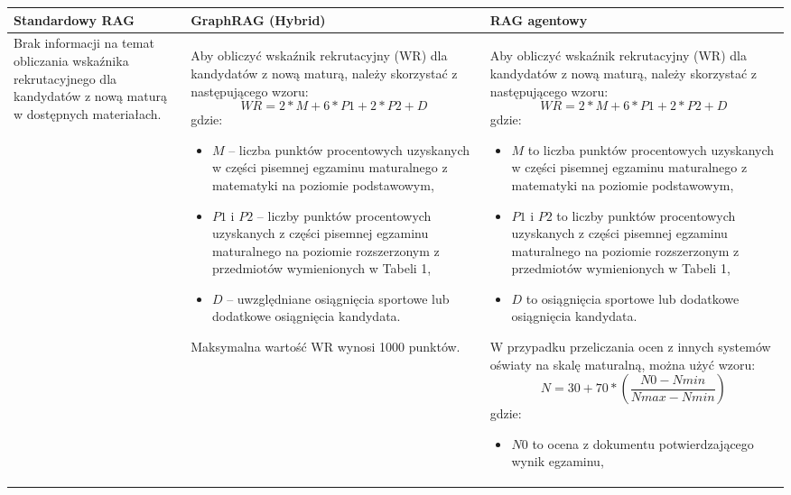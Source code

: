 \noindent
\begin{tabularx}{\textwidth}{@{} >{\raggedright\arraybackslash}X >{\raggedright\arraybackslash}X >{\raggedright\arraybackslash}X @{}}
    \toprule
    \textbf{Standardowy RAG} & \textbf{GraphRAG (Hybrid)} & \textbf{RAG agentowy} \\
    \midrule
    \footnotesize Brak informacji na temat obliczania wskaźnika rekrutacyjnego dla kandydatów z nową maturą w dostępnych materiałach. & \begin{minipage}[t]{\linewidth}\footnotesize Aby obliczyć wskaźnik rekrutacyjny (WR) dla kandydatów z nową maturą, należy skorzystać z następującego wzoru:
\[ WR = 2 * M + 6 * P1 + 2 * P2 + D \]
gdzie:
\begin{itemize}
\item \( M \) – liczba punktów procentowych uzyskanych w części pisemnej egzaminu maturalnego z matematyki na poziomie podstawowym,
\item \( P1 \) i \( P2 \) – liczby punktów procentowych uzyskanych z części pisemnej egzaminu maturalnego na poziomie rozszerzonym z przedmiotów wymienionych w Tabeli 1,
\item \( D \) – uwzględniane osiągnięcia sportowe lub dodatkowe osiągnięcia kandydata.
\end{itemize}
Maksymalna wartość WR wynosi 1000 punktów.\end{minipage} & \begin{minipage}[t]{\linewidth}\footnotesize Aby obliczyć wskaźnik rekrutacyjny (WR) dla kandydatów z nową maturą, należy skorzystać z następującego wzoru:
\[ WR = 2 * M + 6 * P1 + 2 * P2 + D \]
gdzie:
\begin{itemize}
\item \( M \) to liczba punktów procentowych uzyskanych w części pisemnej egzaminu maturalnego z matematyki na poziomie podstawowym,
\item \( P1 \) i \( P2 \) to liczby punktów procentowych uzyskanych z części pisemnej egzaminu maturalnego na poziomie rozszerzonym z przedmiotów wymienionych w Tabeli 1,
\item \( D \) to osiągnięcia sportowe lub dodatkowe osiągnięcia kandydata.
\end{itemize}
W przypadku przeliczania ocen z innych systemów oświaty na skalę maturalną, można użyć wzoru:
\[ N = 30 + 70 * \left( \frac{N0 - Nmin}{Nmax - Nmin} \right) \]
gdzie:
\begin{itemize}
\item \( N0 \) to ocena z dokumentu potwierdzającego wynik egzaminu,

\end{itemize}
\end{minipage}
\end{tabularx}
